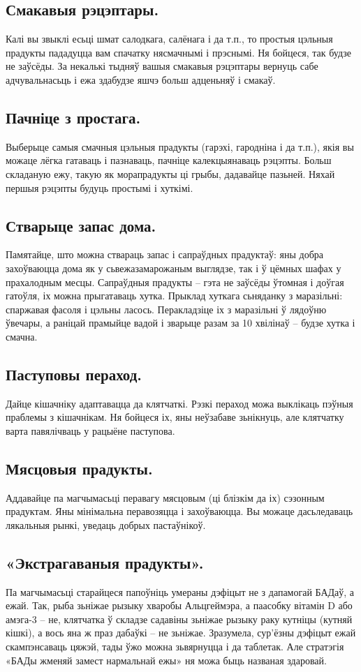 \subsection{Смакавыя рэцэптары.}
Калі вы звыклі есьці шмат салодкага, салёнага і да т.п., то простыя цэльныя прадукты пададуцца вам спачатку нясмачнымі і прэснымі. Ня бойцеся, так будзе не заўсёды. За некалькі тыдняў вашыя смакавыя рэцэптары вернуць сабе адчувальнасьць і ежа здабудзе яшчэ больш адценьняў і смакаў.

\subsection{Пачніце з простага.}
Выберыце самыя смачныя цэльныя прадукты (гарэхі, гародніна і да т.п.), якія вы можаце лёгка гатаваць і пазнаваць, пачніце калекцыянаваць рэцэпты. Больш складаную ежу, такую як морапрадукты ці грыбы, дадавайце пазьней. Няхай першыя рэцэпты будуць простымі і хуткімі.

\subsection{Стварыце запас дома.}
Памятайце, што можна ствараць запас і сапраўдных прадуктаў: яны добра захоўваюцца дома як у сьвежазамарожаным выглядзе, так і ў цёмных шафах у прахалодным месцы. Сапраўдныя прадукты – гэта не заўсёды ўтомная і доўгая гатоўля, іх можна прыгатаваць хутка. Прыклад хуткага сьняданку з маразільні: спаржавая фасоля і цэльны ласось. Перакладзіце іх з маразільні ў лядоўню ўвечары, а раніцай прамыйце вадой і зварыце разам за 10 хвілінаў – будзе хутка і смачна.

\subsection{Паступовы пераход.}
Дайце кішачніку адаптавацца да клятчаткі. Рэзкі пераход можа выклікаць пэўныя праблемы з кішачнікам. Ня бойцеся іх, яны неўзабаве зьнікнуць, але клятчатку варта павялічваць у рацыёне паступова.

\subsection{Мясцовыя прадукты.}
Аддавайце па магчымасьці перавагу мясцовым (ці блізкім да іх) сэзонным прадуктам. Яны мінімальна перавозяцца і захоўваюцца. Вы можаце дасьледаваць лякальныя рынкі, уведаць добрых пастаўнікоў.

\subsection{«Экстрагаваныя прадукты».}
Па магчымасьці старайцеся папоўніць умераны дэфіцыт не з дапамогай БАДаў, а ежай. Так, рыба зьніжае рызыку хваробы Альцгеймэра, а паасобку вітамін D або амэга-3 – не, клятчатка ў складзе садавіны зьніжае рызыку раку кутніцы (кутняй кішкі), а вось яна ж праз дабаўкі – не зьніжае. Зразумела, сур'ёзны дэфіцыт ежай скампэнсаваць цяжэй, тады ўжо можна зьвярнуцца і да таблетак. Але стратэгія «БАДы жменяй замест нармальнай ежы» ня можа быць названая здаровай.

